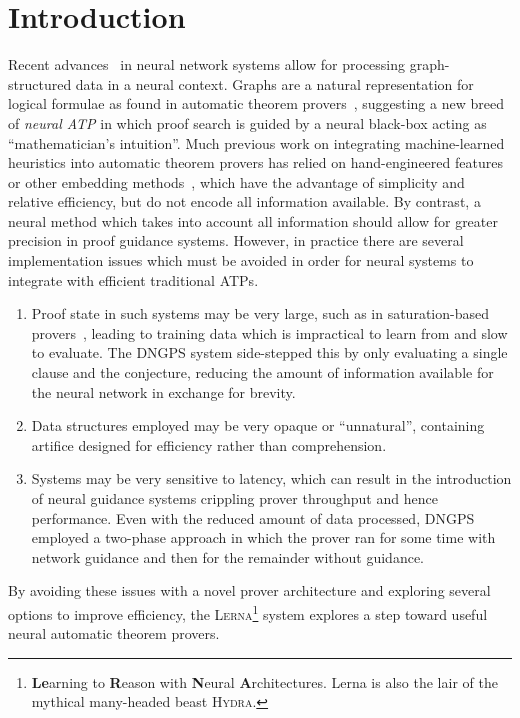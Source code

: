 \documentclass[runningheads]{llncs}
\newcommand{\lerna}{\textsc{Lerna}}
\begin{document}
\section{Introduction}
Recent advances~\cite{graph-cnn,gcn,gcn-relational} in neural network systems allow for processing graph-structured data in a neural context.
Graphs are a natural representation for logical formulae as found in automatic theorem provers~\cite{formula-graph}, suggesting a new breed of \emph{neural ATP} in which proof search is guided by a neural black-box acting as ``mathematician's intuition''.
Much previous work on integrating machine-learned heuristics into automatic theorem provers has relied on hand-engineered features~\cite{MaLeCoP,FEMaLeCoP,rlCoP} or other embedding methods~\cite{ENIGMA}, which have the advantage of simplicity and relative efficiency, but do not encode all information available.
By contrast, a neural method which takes into account all information should allow for greater precision in proof guidance systems.
However, in practice there are several implementation issues which must be avoided in order for neural systems to integrate with efficient traditional ATPs.
\begin{enumerate}
	\item Proof state in such systems may be very large, such as in saturation-based provers~\cite{Vampire}, leading to training data which is impractical to learn from and slow to evaluate. The DNGPS system side-stepped this by only evaluating a single clause and the conjecture, reducing the amount of information available for the neural network in exchange for brevity.
	\item Data structures employed may be very opaque or ``unnatural'', containing artifice designed for efficiency rather than comprehension.
	\item Systems may be very sensitive to latency, which can result in the introduction of neural guidance systems crippling prover throughput and hence performance. Even with the reduced amount of data processed, DNGPS employed a two-phase approach in which the prover ran for some time with network guidance and then for the remainder without guidance.
\end{enumerate}
%
By avoiding these issues with a novel prover architecture and exploring several options to improve efficiency, the \lerna{}\footnote{\textbf{Le}arning to \textbf{R}eason with \textbf{N}eural \textbf{A}rchitectures. Lerna is also the lair of the mythical many-headed beast \textsc{Hydra}.} system explores a step toward useful neural automatic theorem provers.
\end{document}
